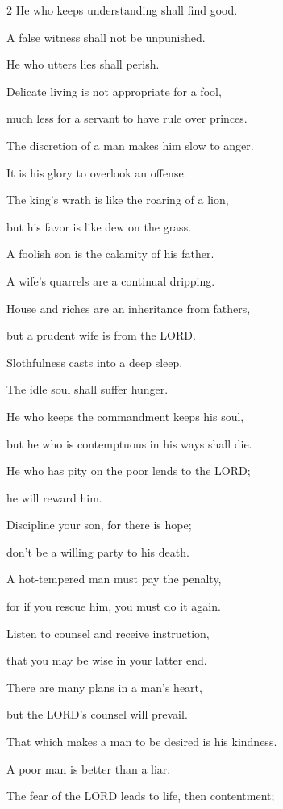 \begin{multicols}{2}
He who keeps understanding shall find good.


\myverse{}A false witness shall not be unpunished.

He who utters lies shall perish.


\myverse{}Delicate living is not appropriate for a fool,

much less for a servant to have rule over princes.


\myverse{}The discretion of a man makes him slow to anger.

It is his glory to overlook an offense.


\myverse{}The king’s wrath is like the roaring of a lion,

but his favor is like dew on the grass.


\myverse{}A foolish son is the calamity of his father.

A wife’s quarrels are a continual dripping.


\myverse{}House and riches are an inheritance from fathers,

but a prudent wife is from the LORD.


\myverse{}Slothfulness casts into a deep sleep.

The idle soul shall suffer hunger.


\myverse{}He who keeps the commandment keeps his soul,

but he who is contemptuous in his ways shall die.


\myverse{}He who has pity on the poor lends to the LORD;

he will reward him.


\myverse{}Discipline your son, for there is hope;

don’t be a willing party to his death.


\myverse{}A hot-tempered man must pay the penalty,

for if you rescue him, you must do it again.


\myverse{}Listen to counsel and receive instruction,

that you may be wise in your latter end.


\myverse{}There are many plans in a man’s heart,

but the LORD’s counsel will prevail.


\myverse{}That which makes a man to be desired is his kindness.

A poor man is better than a liar.


\myverse{}The fear of the LORD leads to life, then contentment;


\end{multicols}
